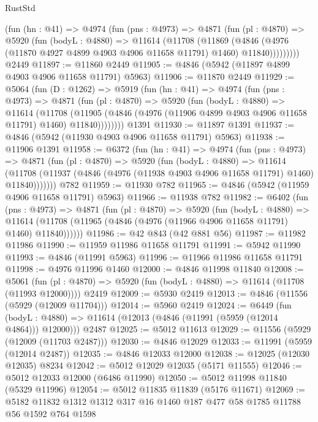 \begin{lexlean}{RustStd}
\begin{coremodule}
        (fun (hn : @41) =>
        @4974
          (fun (pns : @4973) =>
          @4871
            (fun (pl : @4870) =>
            @5920
              (fun (bodyL : @4880) =>
              @11614
                (@11708
                  (@11869
                    (@4846
                      (@4976 (@11870 @4927 @4899 @4903 @4906 @11658 @11791) @1460)
                      @11840)))))))))
    @2449
@11897 := @11860 @2449
@11905 := @4846 (@5942 (@11897 @4899 @4903 @4906 @11658 @11791) @5963)
@11906 := @11870 @2449
@11929 := @5064
    (fun (D : @1262) =>
    @5919
      (fun (hn : @41) =>
      @4974
        (fun (pns : @4973) =>
        @4871
          (fun (pl : @4870) =>
          @5920
            (fun (bodyL : @4880) =>
            @11614
              (@11708
                (@11905 (@4846 (@4976 (@11906 @4899 @4903 @4906 @11658 @11791) @1460) @11840))))))))
    @1391
@11930 := @11897 @1391
@11937 := @4846 (@5942 (@11930 @4903 @4906 @11658 @11791) @5963)
@11938 := @11906 @1391
@11958 := @6372
    (fun (hn : @41) =>
    @4974
      (fun (pns : @4973) =>
      @4871
        (fun (pl : @4870) =>
        @5920
          (fun (bodyL : @4880) =>
          @11614
            (@11708 (@11937 (@4846 (@4976 (@11938 @4903 @4906 @11658 @11791) @1460) @11840)))))))
    @782
@11959 := @11930 @782
@11965 := @4846 (@5942 (@11959 @4906 @11658 @11791) @5963)
@11966 := @11938 @782
@11982 := @6402
    (fun (pns : @4973) =>
    @4871
      (fun (pl : @4870) =>
      @5920
        (fun (bodyL : @4880) =>
        @11614 (@11708 (@11965 (@4846 (@4976 (@11966 @4906 @11658 @11791) @1460) @11840))))))
@11986 := @42 @843 (@42 @881 @56)
@11987 := @11982 @11986
@11990 := @11959 @11986 @11658 @11791
@11991 := @5942 @11990
@11993 := @4846 (@11991 @5963)
@11996 := @11966 @11986 @11658 @11791
@11998 := @4976 @11996 @1460
@12000 := @4846 @11998 @11840
@12008 := @5061
    (fun (pl : @4870) => @5920 (fun (bodyL : @4880) => @11614 (@11708 (@11993 @12000))))
    @2419
@12009 := @5930 @2419
@12013 := @4846 (@11556 (@5929 (@12009 @11704)))
@12014 := @5960 @2419
@12024 := @6449
    (fun (bodyL : @4880) => @11614 (@12013 (@4846 (@11991 (@5959 (@12014 @4864))) @12000)))
    @2487
@12025 := @5012 @11613
@12029 := @11556 (@5929 (@12009 (@11703 @2487)))
@12030 := @4846 @12029
@12033 := @11991 (@5959 (@12014 @2487))
@12035 := @4846 @12033 @12000
@12038 := @12025 (@12030 @12035) @8234
@12042 := @5012 @12029 @12035 (@5171 @11555)
@12046 := @5012 @12033 @12000 (@6486 @11990)
@12050 := @5012 @11998 @11840 (@5329 @11996)
@12054 := @5012 @11835 @11839 (@5176 @11671)
@12069 := @5182 @11832 @1312 @1312 @317 @16 @1460 @187 @477 @58 @1785 @11788 @56 @1592 @764 @1598

\end{coremodule}
\end{lexlean}
